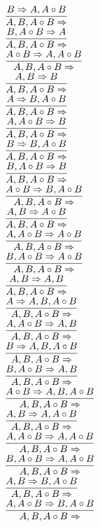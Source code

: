 \documentclass[11pt]{article}
\begin{document}
\begin{center}
\bigskip
\\$\infer{A, B, A\circ B\Rightarrow }{B\Rightarrow A, A\circ B}$
\bigskip
\\$\infer{A, B, A\circ B\Rightarrow }{B, A\circ B\Rightarrow A}$
\bigskip
\\$\infer{A, B, A\circ B\Rightarrow }{A\circ B\Rightarrow A, A\circ B}$
\bigskip
\\$\infer{A, B, A\circ B\Rightarrow }{A, B\Rightarrow B}$
\bigskip
\\$\infer{A, B, A\circ B\Rightarrow }{A\Rightarrow B, A\circ B}$
\bigskip
\\$\infer{A, B, A\circ B\Rightarrow }{A, A\circ B\Rightarrow B}$
\bigskip
\\$\infer{A, B, A\circ B\Rightarrow }{B\Rightarrow B, A\circ B}$
\bigskip
\\$\infer{A, B, A\circ B\Rightarrow }{B, A\circ B\Rightarrow B}$
\bigskip
\\$\infer{A, B, A\circ B\Rightarrow }{A\circ B\Rightarrow B, A\circ B}$
\bigskip
\\$\infer{A, B, A\circ B\Rightarrow }{A, B\Rightarrow A\circ B}$
\bigskip
\\$\infer{A, B, A\circ B\Rightarrow }{A, A\circ B\Rightarrow A\circ B}$
\bigskip
\\$\infer{A, B, A\circ B\Rightarrow }{B, A\circ B\Rightarrow A\circ B}$
\bigskip
\\$\infer{A, B, A\circ B\Rightarrow }{A, B\Rightarrow A, B}$
\bigskip
\\$\infer{A, B, A\circ B\Rightarrow }{A\Rightarrow A, B, A\circ B}$
\bigskip
\\$\infer{A, B, A\circ B\Rightarrow }{A, A\circ B\Rightarrow A, B}$
\bigskip
\\$\infer{A, B, A\circ B\Rightarrow }{B\Rightarrow A, B, A\circ B}$
\bigskip
\\$\infer{A, B, A\circ B\Rightarrow }{B, A\circ B\Rightarrow A, B}$
\bigskip
\\$\infer{A, B, A\circ B\Rightarrow }{A\circ B\Rightarrow A, B, A\circ B}$
\bigskip
\\$\infer{A, B, A\circ B\Rightarrow }{A, B\Rightarrow A, A\circ B}$
\bigskip
\\$\infer{A, B, A\circ B\Rightarrow }{A, A\circ B\Rightarrow A, A\circ B}$
\bigskip
\\$\infer{A, B, A\circ B\Rightarrow }{B, A\circ B\Rightarrow A, A\circ B}$
\bigskip
\\$\infer{A, B, A\circ B\Rightarrow }{A, B\Rightarrow B, A\circ B}$
\bigskip
\\$\infer{A, B, A\circ B\Rightarrow }{A, A\circ B\Rightarrow B, A\circ B}$

\end{center}
\end{document}
